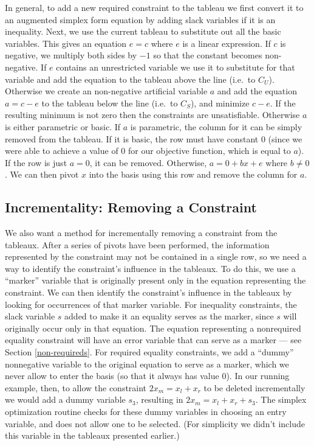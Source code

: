 \documentclass{uist96}
\begin{document}
In general, to add a new required constraint to the tableau we first convert it
to an augmented simplex form equation by adding slack variables if it is an
inequality.  Next, we use the current tableau to substitute out all the
basic variables.  This gives an equation $e = c$ where $e$ is a linear
expression.  If $c$ is negative, we multiply both sides by $-1$ so that the
constant becomes non-negative.  If $e$ contains an unrestricted variable
we use it to substitute for that variable and add the equation to the
tableau above the line (i.e.\ to $C_U$)\@.  Otherwise we create an
non-negative artificial variable $a$ and add the equation $a = c - e$ to
the tableau below the line (i.e.\ to $C_S$), and minimize $c - e$. If the
resulting minimum is not zero then the constraints are unsatisfiable.
Otherwise $a$ is either parametric or basic.  If $a$ is parametric, the
column for it can be simply removed from the tableau.  If it is basic, the
row must have constant 0 (since we were able to achieve a value of 0 for
our objective function, which is equal to $a$).  If the row is just 
$a = 0$, it can be removed.  Otherwise, $a = 0 + b x + e$ where $b \neq 0$.
We can then pivot $x$ into the basis using this row and remove the column
for $a$.


\subsection{Incrementality: Removing a Constraint}
\label{removing-constraints}

We also want a method for incrementally removing a constraint from the
tableaux.  After a series of pivots have been performed, the information
represented by the constraint may not be contained in a single row, so we
need a way to identify the constraint's influence in the tableaux.  To do
this, we use a ``marker'' variable that is originally present only in the
equation representing the constraint.  We can then identify the
constraint's influence in the tableaux by looking for occurrences of that
marker variable.  For inequality constraints, the slack variable $s$ added
to make it an equality serves as the marker, since $s$ will originally
occur only in that equation.  The equation representing a nonrequired
equality constraint will have an error variable that can serve as a marker
--- see Section \ref{non-requireds}.  For required equality constraints, we
add a ``dummy'' nonnegative variable to the original equation to serve as a
marker, which we never allow to enter the basis (so that it always has
value 0).  In our running example, then, to allow the constraint $2 x_m =
x_l + x_r$ to be deleted incrementally we would add a dummy variable $s_3$,
resulting in $2 x_m = x_l + x_r + s_3$.  The simplex optimization routine
checks for these dummy variables in choosing an entry variable, and does
not allow one to be selected.  (For simplicity we didn't include this
variable in the tableaux presented earlier.)
\end{document}
